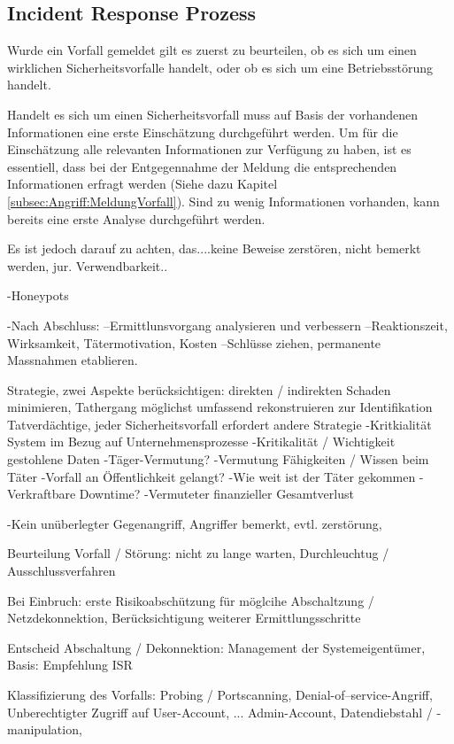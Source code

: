 \subsection{Incident Response Prozess}
Wurde ein Vorfall gemeldet gilt es zuerst zu beurteilen, ob es sich um einen wirklichen Sicherheitsvorfalle handelt, oder ob es sich um eine Betriebsstörung handelt.

Handelt es sich um einen Sicherheitsvorfall muss auf Basis der vorhandenen Informationen eine erste Einschätzung durchgeführt werden. Um für die Einschätzung alle relevanten Informationen zur Verfügung zu haben, ist es essentiell, dass bei der Entgegennahme der Meldung die entsprechenden Informationen erfragt werden (Siehe dazu Kapitel \ref{subsec:Angriff:MeldungVorfall}). Sind zu wenig Informationen vorhanden, kann bereits eine erste Analyse durchgeführt werden. 

Es ist jedoch darauf zu achten, das....keine Beweise zerstören, nicht bemerkt werden, jur. Verwendbarkeit..


-Honeypots


-Nach Abschluss:
--Ermittlunsvorgang analysieren und verbessern
--Reaktionszeit, Wirksamkeit, Tätermotivation, Kosten
--Schlüsse ziehen, permanente Massnahmen etablieren.

Strategie, zwei Aspekte berücksichtigen: direkten / indirekten Schaden minimieren, Tathergang möglichst umfassend rekonstruieren zur Identifikation Tatverdächtige, jeder Sicherheitsvorfall erfordert andere Strategie
-Kritkialität System im Bezug auf Unternehmensprozesse
-Kritikalität / Wichtigkeit gestohlene Daten
-Täger-Vermutung?
-Vermutung Fähigkeiten / Wissen beim Täter
-Vorfall an Öffentlichkeit gelangt?
-Wie weit ist der Täter gekommen
-Verkraftbare Downtime?
-Vermuteter finanzieller Gesamtverlust

-Kein unüberlegter Gegenangriff, Angriffer bemerkt, evtl. zerstörung,



Beurteilung Vorfall / Störung: nicht zu lange warten, Durchleuchtug / Ausschlussverfahren

Bei Einbruch: erste Risikoabschützung für möglcihe Abschaltzung / Netzdekonnektion, Berücksichtigung weiterer Ermittlungsschritte

Entscheid Abschaltung / Dekonnektion: Management der Systemeigentümer, Basis: Empfehlung ISR

Klassifizierung  des Vorfalls: Probing  / Portscanning, Denial-of--service-Angriff, Unberechtigter Zugriff auf User-Account, ... Admin-Account, Datendiebstahl / -manipulation,



